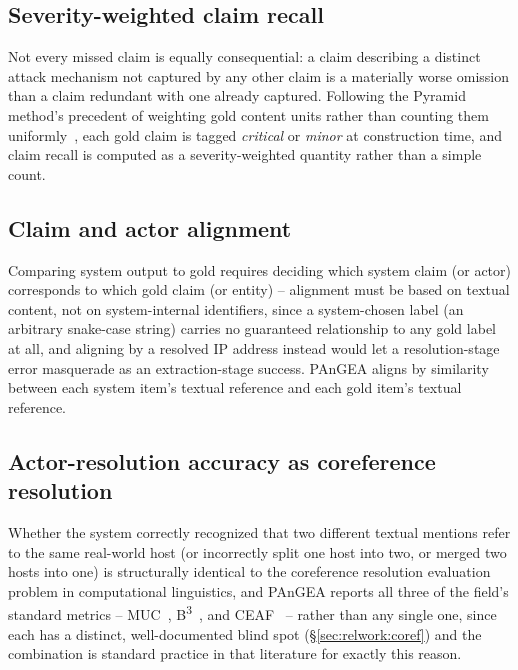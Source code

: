 \documentclass[sigconf,nonacm]{acmart}
\begin{document}
\subsection{Severity-weighted claim recall}

Not every missed claim is equally consequential: a claim describing a
distinct attack mechanism not captured by any other claim is a materially
worse omission than a claim redundant with one already captured. Following
the Pyramid method's precedent of weighting gold content units rather than
counting them uniformly~\cite{nenkova2004pyramid}, each gold claim is tagged
\emph{critical} or \emph{minor} at construction time, and claim recall is
computed as a severity-weighted quantity rather than a simple count.

\subsection{Claim and actor alignment}

Comparing system output to gold requires deciding which system claim (or
actor) corresponds to which gold claim (or entity) -- alignment must be based
on textual content, not on system-internal identifiers, since a system-chosen
label (an arbitrary snake-case string) carries no guaranteed relationship to
any gold label at all, and aligning by a resolved IP address instead would let
a resolution-stage error masquerade as an extraction-stage success. PAnGEA
aligns by similarity between each system item's textual reference and each
gold item's textual reference.

\subsection{Actor-resolution accuracy as coreference resolution}

Whether the system correctly recognized that two different textual mentions
refer to the same real-world host (or incorrectly split one host into two, or
merged two hosts into one) is structurally identical to the coreference
resolution evaluation problem in computational linguistics, and PAnGEA reports
all three of the field's standard metrics -- MUC~\cite{vilain1995muc},
B\textsuperscript{3}~\cite{bagga1998bcubed}, and CEAF~\cite{luo2005ceaf} --
rather than any single one, since each has a distinct, well-documented blind
spot (\S\ref{sec:relwork:coref}) and the combination is standard practice in
that literature for exactly this reason.
\end{document}
